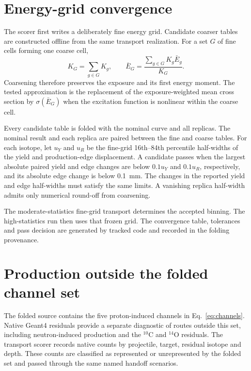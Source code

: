 \documentclass[11pt]{article}
\begin{document}
\section{Energy-grid convergence}

The scorer first writes a deliberately fine energy grid.  Candidate coarser
tables are constructed offline from the same transport realization.  For a
set $G$ of fine cells forming one coarse cell,
\begin{equation}
 K_G=\sum_{g\in G}K_g,
 \qquad
 \bar E_G=\frac{\sum_{g\in G}K_g\bar E_g}{K_G}.
 \label{eq:coarsen}
\end{equation}
Coarsening therefore preserves the exposure and its first energy moment.  The
tested approximation is the replacement of the exposure-weighted mean cross
section by $\sigma(\bar E_G)$ when the excitation function is nonlinear within
the coarse cell.

Every candidate table is folded with the nominal curve and all replicas.  The
nominal result and each replica are paired between the fine and coarse tables.
For each isotope, let $u_Y$ and $u_R$ be the fine-grid 16th--84th percentile
half-widths of the yield and production-edge displacement.  A candidate passes
when the largest absolute paired yield and edge changes are below $0.1u_Y$ and
$0.1u_R$, respectively, and its absolute edge change is below
\SI{0.1}{mm}.  The changes in the reported yield and edge half-widths must
satisfy the same limits.  A vanishing replica half-width admits only numerical
round-off from coarsening.

The moderate-statistics fine-grid transport determines the accepted binning.
The high-statistics run then uses that frozen grid.  The convergence table,
tolerances and pass decision are generated by tracked code and recorded in the
folding provenance.

\section{Production outside the folded channel set}

The folded source contains the five proton-induced channels in
Eq.~\eqref{eq:channels}.  Native Geant4 residuals provide a separate diagnostic
of routes outside this set, including neutron-induced production and the
$^{10}$C and $^{14}$O residuals.  The transport scorer records native counts by
projectile, target, residual isotope and depth.  These counts are classified
as represented or unrepresented by the folded set and passed through the same
named handoff scenarios.
\end{document}
